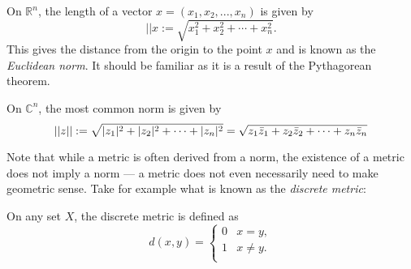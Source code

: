 \begin{example}
On $\mathbb{R}^n$, the length of a vector $x = (x_1, x_2, ..., x_n)$ is given by
\[||x := \sqrt{x_1^2+x_2^2+\cdots+x_n^2}.\]
This gives the distance from the origin to the point $x$ and is known as the \textit{Euclidean norm}.  It should be familiar as it is a result of the Pythagorean theorem.
\end{example}

\begin{example}
On $\mathbb{C}^n$, the most common norm is given by
\[||z|| := \sqrt{|z_1|^2 + |z_2|^2 + \cdots + |z_n|^2} = \sqrt{z_1\bar{z}_1 + z_2\bar{z}_2 + \cdots + z_n\bar{z}_n}\]
\end{example}

Note that while a metric is often derived from a norm, the existence of a metric does not imply a norm --- a metric does not even necessarily need to make geometric sense.  Take for example what is known as the \textit{discrete metric}:

\begin{example}
On any set $X$, the discrete metric is defined as
\[d(x,y)= 
\begin{cases} 
	0 & x=y, \\
	1 & x \neq y.\\
\end{cases}
\]
\end{example}